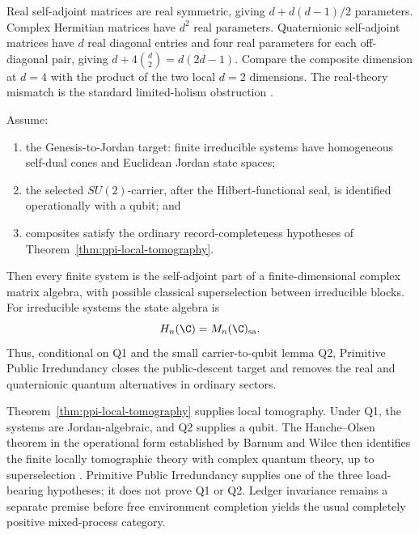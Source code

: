 \begin{proofsketch}
Real self-adjoint matrices are real symmetric, giving
\(d+d(d-1)/2\) parameters.  Complex Hermitian matrices have \(d^2\) real parameters.
Quaternionic self-adjoint matrices have \(d\) real diagonal entries and four real
parameters for each off-diagonal pair, giving
\(d+4\binom d2=d(2d-1)\).  Compare the composite dimension at \(d=4\) with the
product of the two local \(d=2\) dimensions.  The real-theory mismatch is the
standard limited-holism obstruction \cite{hardy-wootters-real}.
\end{proofsketch}

\begin{theorem}
\label{thm:conditional-complex-reconstruction-ppi}
Assume:
\begin{enumerate}[label=\textup{Q\arabic*},leftmargin=2.4em]
\item the Genesis-to-Jordan target: finite irreducible systems have homogeneous
      self-dual cones and Euclidean Jordan state spaces;
\item the selected \(SU(2)\)-carrier, after the Hilbert-functional seal, is identified
      operationally with a qubit; and
\item composites satisfy the ordinary record-completeness hypotheses of
      Theorem~\ref{thm:ppi-local-tomography}.
\end{enumerate}
Then every finite system is the self-adjoint part of a finite-dimensional complex
matrix algebra, with possible classical superselection between irreducible blocks.
For irreducible systems the state algebra is
\[
  H_n(\C)=M_n(\C)_{\mathrm{sa}}.
\]
Thus, conditional on Q1 and the small carrier-to-qubit lemma Q2, Primitive Public
Irredundancy closes the public-descent target and removes the real and quaternionic
quantum alternatives in ordinary sectors.
\end{theorem}

\begin{proofsketch}
Theorem~\ref{thm:ppi-local-tomography} supplies local tomography.  Under Q1, the
systems are Jordan-algebraic, and Q2 supplies a qubit.  The Hanche--Olsen theorem in
the operational form established by Barnum and Wilce then identifies the finite
locally tomographic theory with complex quantum theory, up to superselection
\cite{barnum-wilce-local}.  Primitive Public Irredundancy supplies one of the three
load-bearing hypotheses; it does not prove Q1 or Q2.  Ledger invariance remains a
separate premise before free environment completion yields the usual completely
positive mixed-process category.
\end{proofsketch}


